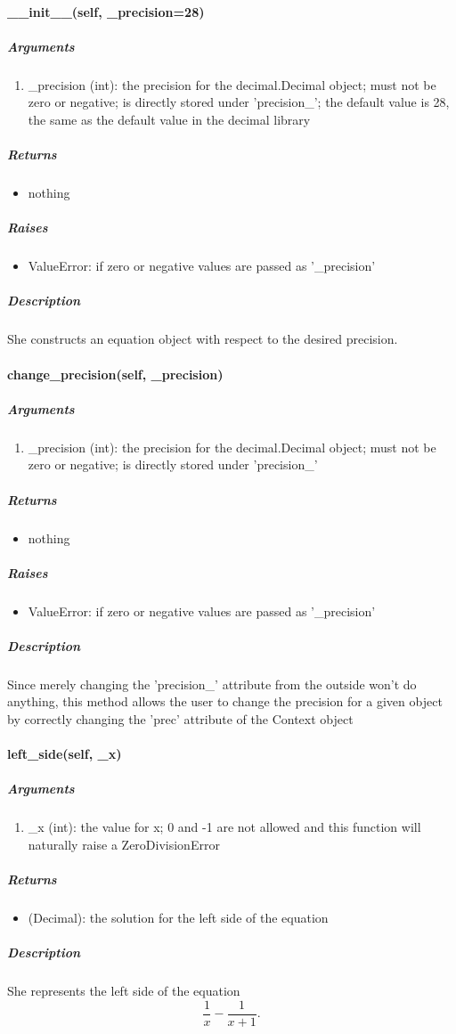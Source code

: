 \paragraph{\_\_init\_\_(self, \_precision=28)}
\subparagraph*{Arguments}
\begin{enumerate}
    \item \_precision (int): the precision for the decimal.Decimal object; must not be zero or negative; is directly stored under 'precision\_'; the default value is 28, the same as the default value in the decimal library
\end{enumerate}
\subparagraph*{Returns}
\begin{itemize}
    \item nothing
\end{itemize}
\subparagraph*{Raises}
\begin{itemize}
    \item ValueError: if zero or negative values are passed as '\_precision'
\end{itemize}
\subparagraph*{Description}
She constructs an equation object with respect to the desired precision.
\paragraph{change\_precision(self, \_precision)}
\subparagraph*{Arguments}
\begin{enumerate}
    \item \_precision (int): the precision for the decimal.Decimal object; must not be zero or negative; is
    directly stored under 'precision\_'
\end{enumerate}
\subparagraph*{Returns}
\begin{itemize}
    \item nothing
\end{itemize}
\subparagraph*{Raises}
\begin{itemize}
    \item ValueError: if zero or negative values are passed as '\_precision'
\end{itemize}
\subparagraph*{Description}
Since merely changing the 'precision\_' attribute from the outside won't do anything, this method allows the user to change the precision for a given object by correctly changing the 'prec' attribute of the Context object
\paragraph{left\_side(self, \_x)}
\subparagraph*{Arguments}
\begin{enumerate}
    \item \_x (int): the value for x; 0 and -1 are not allowed and this function will naturally raise a ZeroDivisionError
\end{enumerate}
\subparagraph*{Returns}
\begin{itemize}
    \item (Decimal): the solution for the left side of the equation
\end{itemize}
\subparagraph*{Description}
She represents the left side of the equation
\begin{equation*}
    \frac{1}{x} - \frac{1}{x + 1} \text{.}
\end{equation*}
